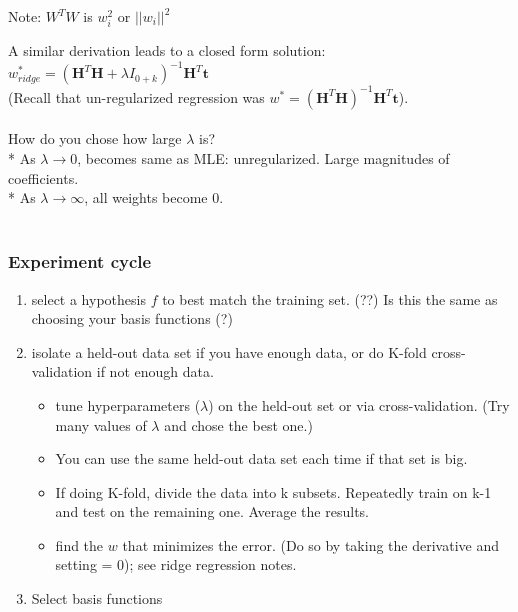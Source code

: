 Note: $W^TW$ is $w_i^2$ or $|| w_i ||^2$ 

A similar derivation leads to a closed form solution:  \hfill \\
$w_{ridge}^* = (\bm{H}^T\bm{H} + \lambda I_{0+k})^{-1}\bm{H}^T\bm{t}$ \hfill \\
(Recall that un-regularized regression was $w^* = (\bm{H}^T\bm{H})^{-1}\bm{H}^T\bm{t}$).  \hfill \\   \hfill \\

How do you chose how large $\lambda$ is? \hfill \\
* As $\lambda \rightarrow 0$, becomes same as MLE: unregularized.  Large magnitudes of coefficients. \hfill \\
* As $\lambda \rightarrow \infty$, all weights become 0.  \hfill \\   \hfill \\

\subsubsection{Experiment cycle}
\begin{enumerate}
	\item select a hypothesis $f$ to best match the training set.  
		(??) Is this the same as choosing your basis functions (?)
	\item isolate a held-out data set if you have enough data, or do K-fold cross-validation if not enough data. 
	\begin{itemize}
		\item tune hyperparameters ($\lambda$) on the held-out set or via cross-validation.  
			(Try many values of $\lambda$ and chose the best one.) 
		\item You can use the same held-out data set each time if that set is big.  
		\item If doing K-fold, divide the data into k subsets.  
				Repeatedly train on k-1 and test on the remaining one.  
				Average the results. 
		\item find the $w$ that minimizes the error.  
			(Do so by taking the derivative and setting = 0); 
			see ridge regression notes. 
	\end{itemize}
	\item Select basis functions
\end{enumerate}

